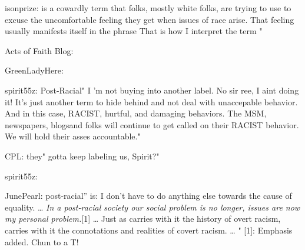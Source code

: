     isonprize:  is a cowardly term that folks,
    mostly white folks, are trying to use to excuse the uncomfortable
    feeling they get when issues of race arise. That feeling usually
    manifests itself in the phrase
    That is how I interpret the term  "
  \item
    Acts of Faith Blog:
  \item
    GreenLadyHere:
  \item
    spirit55z: Post-Racial" I 'm
    not buying into another label. No sir ree, I aint doing it! It's
    just another term to hide behind and not deal with unaccepable
    behavior. And in this case, RACIST, hurtful, and damaging
    behaviors. The MSM, newspapers, blogsand folks will continue to get
    called on their RACIST behavior. We will hold their asses
    accountable."
    \startitemize
    \item
      CPL: they" gotta keep labeling us, Spirit?"
      \startitemize
      \item
        spirit55z:
      \stopitemize
    \stopitemize
  \item
    JunePearl:
    post-racial” is: I
    don't have to do anything else towards the cause of equality.
    \ldots{}
    {\em In a post-racial society our social problem is no longer, issues are now my personal problem.}[1]
    \ldots{} Just as  carries with it the history of
    overt racism,  carries with it the
    connotations and realities of covert racism. \ldots{} "
    [1]: Emphasis added. Chun to a T!
  \stopitemize
\stopitemize

